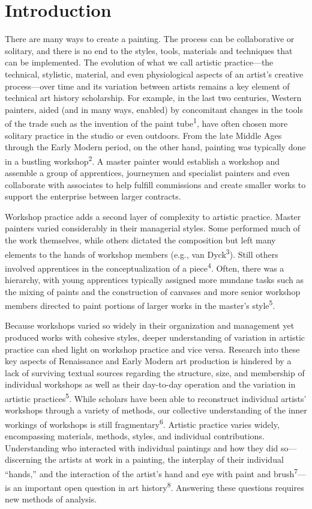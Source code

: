 \documentclass[11pt]{article}
\begin{document}
\section*{Introduction}

There are many ways to create a painting. The process can be
collaborative or solitary, and there is no end to the styles, tools,
materials and techniques that can be implemented. The evolution of what
we call artistic practice---the technical, stylistic, material, and even
physiological aspects of an artist's creative process---over time and its
variation between artists remains a key element of technical art history
scholarship. For example, in the last two centuries, Western painters,
aided (and in many ways, enabled) by concomitant changes in the tools of
the trade such as the invention of the paint tube\textsuperscript{1},
have often chosen more solitary practice in the studio or even outdoors.
From the late Middle Ages through the Early Modern period, on the other
hand, painting was typically done in a bustling
workshop\textsuperscript{2}. A master painter would establish a workshop
and assemble a group of apprentices, journeymen and specialist painters
and even collaborate with associates to help fulfill commissions and
create smaller works to support the enterprise between larger contracts.

Workshop practice adds a second layer of complexity to artistic
practice. Master painters varied considerably in their managerial
styles. Some performed much of the work themselves, while others
dictated the composition but left many elements to the hands of workshop
members (e.g., van Dyck\textsuperscript{3}). Still others involved
apprentices in the conceptualization of a piece\textsuperscript{4}.
Often, there was a hierarchy, with young apprentices typically assigned
more mundane tasks such as the mixing of paints and the construction of
canvases and more senior workshop members directed to paint portions of
larger works in the master's style\textsuperscript{5}.

Because workshops varied so widely in their organization and management
yet produced works with cohesive styles, deeper understanding of
variation in artistic practice can shed light on workshop practice and
vice versa. Research into these key aspects of Renaissance and Early
Modern art production is hindered by a lack of surviving textual sources
regarding the structure, size, and membership of individual workshops as
well as their day-to-day operation and the variation in artistic
practices\textsuperscript{5}. While scholars have been able to
reconstruct individual artists' workshops through a variety of methods,
our collective understanding of the inner workings of workshops is still
fragmentary\textsuperscript{6}. Artistic practice varies widely,
encompassing materials, methods, styles, and individual contributions.
Understanding who interacted with individual paintings and how they did
so---discerning the artists at work in a painting, the interplay of their
individual ``hands,'' and the interaction of the artist's hand and eye
with paint and brush\textsuperscript{7}---is an important open question
in art history\textsuperscript{8}. Answering these questions requires
new methods of analysis.
\end{document}
